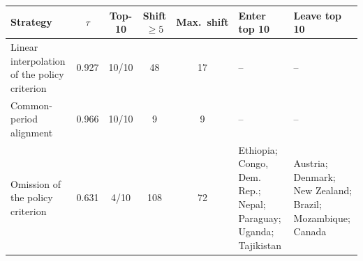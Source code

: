 \begin{tabular}{>{\raggedright\arraybackslash}p{3.0cm}cccc>{\raggedright\arraybackslash}p{3.0cm}>{\raggedright\arraybackslash}p{3.0cm}}
\toprule
Strategy & $\tau$ & Top-10 & Shift $\ge5$ & Max.\ shift & Enter top 10 & Leave top 10 \\
\midrule
Linear interpolation of the policy criterion & 0.927 & 10/10 & 48 & 17 & -- & -- \\
Common-period alignment & 0.966 & 10/10 & 9 & 9 & -- & -- \\
Omission of the policy criterion & 0.631 & 4/10 & 108 & 72 & Ethiopia; Congo, Dem. Rep.; Nepal; Paraguay; Uganda; Tajikistan & Austria; Denmark; New Zealand; Brazil; Mozambique; Canada \\
\bottomrule
\end{tabular}
